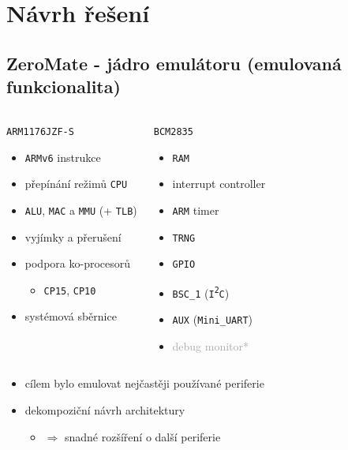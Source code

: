 \documentclass[compress]{beamer}
\begin{document}
\section{Návrh řešení}

\subsection{ZeroMate - jádro emulátoru (emulovaná funkcionalita)}

\begin{frame}
	\begin{columns}
		\begin{block}{\texttt{ARM1176JZF-S}}
			\begin{itemize}
				\item \texttt{ARMv6} instrukce
				\item přepínání režimů \texttt{CPU}
				\item \texttt{ALU}, \texttt{MAC} a \texttt{MMU} (+ \texttt{TLB})
				\item vyjímky a přerušení
				\item podpora ko-procesorů
				\begin{itemize}
					\item \texttt{CP15}, \texttt{CP10}
				\end{itemize}
				\item systémová sběrnice
			\end{itemize}
		\end{block}
		\begin{block}{\texttt{BCM2835}}
			\begin{itemize}
				\item \texttt{RAM}
				\item interrupt controller
				\item \texttt{ARM} timer
				\item \texttt{TRNG}
				\item \texttt{GPIO}
				\item \texttt{BSC\_1} (\texttt{I\textsuperscript{2}C})
				\item \texttt{AUX} (\texttt{Mini\_UART})
				\item \textcolor{darkgray}{debug monitor*} 
			\end{itemize}
		\end{block}
	\end{columns}
	\vspace{0.4cm}
	\noindent\makebox[\linewidth]{\rule{\textwidth}{0.4pt}}
	\vspace{-0.4cm}
	\begin{itemize}
		\item cílem bylo emulovat nejčastěji používané periferie
		\item dekompoziční návrh architektury 
		\begin{itemize}
			\item $\Rightarrow$ snadné rozšíření o další periferie
		\end{itemize}
	\end{itemize}
\end{frame}
\end{document}
